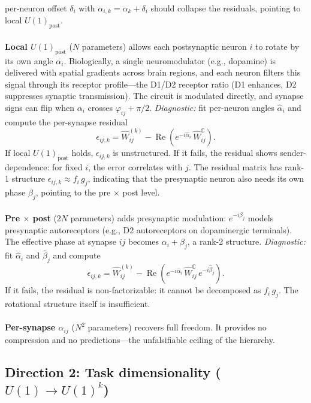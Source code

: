 \documentclass[11pt,a4paper]{article}
\newcommand{\C}{\mathbb{C}}
\newcommand{\re}{\operatorname{Re}}
\begin{document}
{per-neuron offset $\delta_i$ with $\alpha_{i,k} = \hat{\alpha}_k 
+ \delta_i$ should collapse the residuals, pointing to local 
$U(1)_{\text{post}}$.
\\
\\
\textbf{Local $U(1)_{\text{post}}$} ($N$ parameters) allows each 
postsynaptic neuron $i$ to rotate by its own angle $\alpha_i$. 
Biologically, a single neuromodulator (e.g., dopamine) is delivered 
with spatial gradients across brain regions, and each neuron filters 
this signal through its receptor profile---the D1/D2 receptor ratio 
(D1 enhances, D2 suppresses synaptic transmission). The circuit is 
modulated directly, and synapse signs can flip when $\alpha_i$ 
crosses $\varphi_{ij} + \pi/2$. \emph{Diagnostic:} fit per-neuron 
angles $\hat{\alpha}_i$ and compute the per-synapse residual
\begin{equation}
\epsilon_{ij,k} = \hat{W}^{(k)}_{ij} 
- \re\!\left(e^{-i\hat{\alpha}_i}\, \hat{W}^{\C}_{ij}\right).
\end{equation}
If local $U(1)_{\text{post}}$ holds, $\epsilon_{ij,k}$ is 
unstructured. If it fails, the residual shows sender-dependence: 
for fixed $i$, the error correlates with $j$. The residual matrix 
has rank-1 structure $\epsilon_{ij,k} \approx f_i\, g_j$, 
indicating that the presynaptic neuron also needs its own phase 
$\beta_j$, pointing to the pre $\times$ post level.
\\
\\
\textbf{Pre $\times$ post} ($2N$ parameters) adds presynaptic 
modulation: $e^{-i\beta_j}$ models presynaptic autoreceptors 
(e.g., D2 autoreceptors on dopaminergic terminals). The effective 
phase at synapse $ij$ becomes $\alpha_i + \beta_j$, a rank-2 
structure. \emph{Diagnostic:} fit $\hat{\alpha}_i$ and 
$\hat{\beta}_j$ and compute
\begin{equation}
\epsilon_{ij,k} = \hat{W}^{(k)}_{ij} 
- \re\!\left(e^{-i\hat{\alpha}_i}\, 
\hat{W}^{\C}_{ij}\, e^{-i\hat{\beta}_j}\right).
\end{equation}
If it fails, the residual is non-factorizable: it cannot be 
decomposed as $f_i\, g_j$. The rotational structure itself is 
insufficient.
\\
\\
\textbf{Per-synapse $\alpha_{ij}$} ($N^2$ parameters) recovers 
full freedom. It provides no compression and no predictions---the 
unfalsifiable ceiling of the hierarchy.


\subsection{Direction 2: Task dimensionality 
($U(1) \to U(1)^k$)}

}
\end{document}
